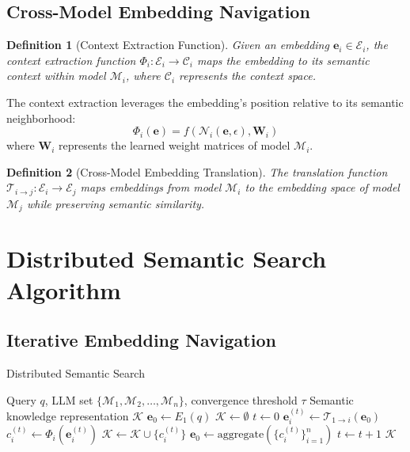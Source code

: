 \documentclass{article}
\newtheorem{definition}{Definition}
\begin{document}
\subsection{Cross-Model Embedding Navigation}

\begin{definition}[Context Extraction Function]
Given an embedding $\mathbf{e}_i \in \mathcal{E}_i$, the context extraction function $\Phi_i: \mathcal{E}_i \rightarrow \mathcal{C}_i$ maps the embedding to its semantic context within model $\mathcal{M}_i$, where $\mathcal{C}_i$ represents the context space.
\end{definition}

The context extraction leverages the embedding's position relative to its semantic neighborhood:
$$\Phi_i(\mathbf{e}) = f\left(\mathcal{N}_i(\mathbf{e}, \epsilon), \mathbf{W}_i\right)$$
where $\mathbf{W}_i$ represents the learned weight matrices of model $\mathcal{M}_i$.

\begin{definition}[Cross-Model Embedding Translation]
The translation function $\mathcal{T}_{i \rightarrow j}: \mathcal{E}_i \rightarrow \mathcal{E}_j$ maps embeddings from model $\mathcal{M}_i$ to the embedding space of model $\mathcal{M}_j$ while preserving semantic similarity.
\end{definition}

\section{Distributed Semantic Search Algorithm}

\subsection{Iterative Embedding Navigation}

\begin{algorithm}
\caption{Distributed Semantic Search}
\begin{algorithmic}[1]
\REQUIRE Query $q$, LLM set $\{\mathcal{M}_1, \mathcal{M}_2, \ldots, \mathcal{M}_n\}$, convergence threshold $\tau$
\ENSURE Semantic knowledge representation $\mathcal{K}$
\STATE $\mathbf{e}_0 \leftarrow E_1(q)$ 
\STATE $\mathcal{K} \leftarrow \emptyset$ 
\STATE $t \leftarrow 0$ 
\REPEAT
        \STATE $\mathbf{e}_i^{(t)} \leftarrow \mathcal{T}_{1 \rightarrow i}(\mathbf{e}_0)$ 
        \STATE $c_i^{(t)} \leftarrow \Phi_i(\mathbf{e}_i^{(t)})$ 
        \STATE $\mathcal{K} \leftarrow \mathcal{K} \cup \{c_i^{(t)}\}$ 
    \ENDFOR
    \STATE $\mathbf{e}_0 \leftarrow \text{aggregate}(\{c_i^{(t)}\}_{i=1}^n)$ 
    \STATE $t \leftarrow t + 1$
\RETURN $\mathcal{K}$
\end{algorithmic}
\end{algorithm}
\end{document}
